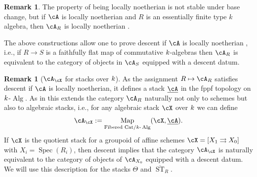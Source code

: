 \documentclass[a4paper]{amsart}
\numberwithin{equation}{section}
\theoremstyle{plain}
\theoremstyle{definition}
\newtheorem{remark}[thm]{Remark}
\DeclareMathOperator{\Spec}{Spec}
\DeclareMathOperator{\ST}{ST}
\DeclareMathOperator{\Map}{Map}
\DeclareMathOperator{\alg}{Alg}
\def\oST{\overline{\ST}}
\begin{document}
\begin{remark}
	The property of being locally noetherian is not stable under base change, but if $\cA$ is locally noetherian and $R$ is an essentially finite type $k$ algebra, then $\cA_R$ is locally noetherian \cite[Cor.~B6.3]{artin-zhang}.
\end{remark}	

The above constructions allow one to prove descent if $\cA$ is locally noetherian \cite[Thm.~C8.6]{artin-zhang}, i.e., if $R\to S$ is a faithfully flat map of commutative $k$-algebras then $\cA_R$ is equivalent to the category of objects in $\cA_S$ equipped with a descent datum.

\begin{remark}[$\cA_{\cX}$ for stacks 	over $k$]\label{R:AforStacks}
	As the assignment $R \mapsto \cA_R$ satisfies descent if $\cA$ is locally noetherian, it defines a stack $\underline{\cA}$ in the fppf topology on $k$-$\alg$. As in \cite{lmb} this  extends the category $\cA_R$ naturally not only to schemes but also to algebraic stacks, i.e., for any algebraic stack $\cX$ over $k$ we can define 
	$$\cA_{\cX} := \Map_{\text{Fibered Cat}/\base\text{-}\alg}(\cX,\underline{\cA}).$$  
If $\cX$ is the quotient stack for a groupoid of affine schemes $\cX= [X_1 \rightrightarrows X_0]$ with $X_i=\Spec(R_i)$, then descent implies that the category $\cA_{\cX}$ is naturally equivalent to the category of objects of $\cA_{X_0}$ equipped with a descent datum. We will use this description for the stacks $\Theta$ and $\oST_R$.
\end{remark}
\end{document}
